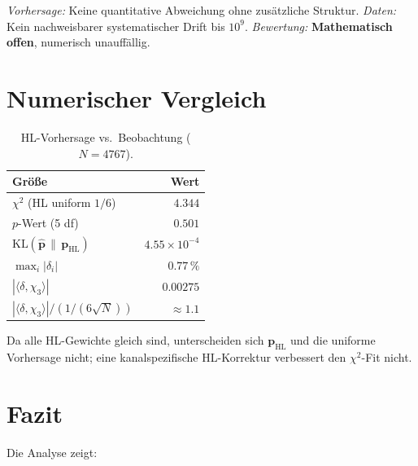 \documentclass[11pt,a4paper]{article}
\newcommand{\HL}{\mathrm{HL}}
\begin{document}
\emph{Vorhersage:} Keine quantitative Abweichung ohne zusätzliche Struktur.
\emph{Daten:} Kein nachweisbarer systematischer Drift bis $10^9$.
\emph{Bewertung:} \textbf{Mathematisch offen}, numerisch unauffällig.

\section{Numerischer Vergleich}

\begin{table}[h]
\centering
\caption{HL-Vorhersage vs.\ Beobachtung ($N=4767$).}
\label{tab:goodness}
\begin{tabular}{@{}lr@{}}
\toprule
Größe & Wert \\
\midrule
$\chi^2$ (HL uniform $1/6$) & $4.344$ \\
$p$-Wert (5 df) & $0.501$ \\
$\mathrm{KL}(\hat{\mathbf p}\,\|\,\mathbf p_{\HL})$ & $4.55\times 10^{-4}$ \\
$\max_i |\delta_i|$ & $0.77\,\%$ \\
$|\langle\delta,\chi_3\rangle|$ & $0.00275$ \\
$|\langle\delta,\chi_3\rangle|/(1/(6\sqrt{N}))$ & $\approx 1.1$ \\
\bottomrule
\end{tabular}
\end{table}

Da alle HL-Gewichte gleich sind, unterscheiden sich
$\mathbf p_{\HL}$ und die uniforme Vorhersage nicht;
eine kanalspezifische HL-Korrektur verbessert den $\chi^2$-Fit nicht.

\section{Fazit}

Die Analyse zeigt:
\end{document}
